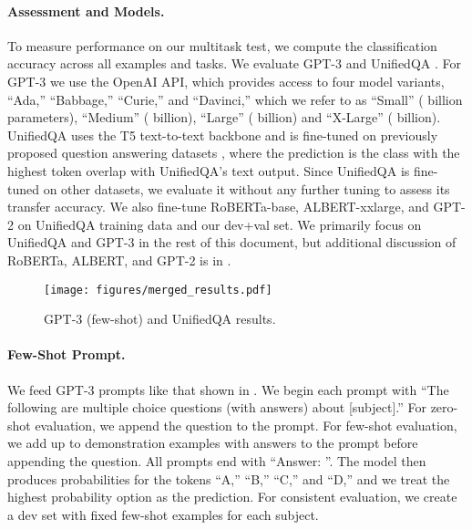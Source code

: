 \documentclass{article} \usepackage{iclr2021_conference, times}
\begin{document}
\paragraph{Assessment and Models.} To measure performance on our multitask test, we compute the classification accuracy across all examples and tasks. We evaluate GPT-3 \citep{brown2020gpt3} and UnifiedQA \citep{khashabi2020unifiedqa}.
For GPT-3 we use the OpenAI API, which provides access to four model variants,  ``Ada,'' ``Babbage,'' ``Curie,'' and ``Davinci,'' which we refer to as ``Small'' ( billion parameters), ``Medium'' ( billion), ``Large'' ( billion) and ``X-Large'' ( billion). 
UnifiedQA uses the T5 \citep{raffel2019exploringT5} text-to-text backbone and is fine-tuned on previously proposed question answering datasets \citep{lai2017race}, where the prediction is the class with the highest token overlap with UnifiedQA's text output. Since UnifiedQA is fine-tuned on other datasets, we evaluate it without any further tuning to assess its transfer accuracy. We also fine-tune RoBERTa-base, ALBERT-xxlarge, and GPT-2 on UnifiedQA training data and our dev+val set. We primarily focus on UnifiedQA and GPT-3 in the rest of this document, but additional discussion of RoBERTa, ALBERT, and GPT-2 is in .


\begin{wrapfigure}{R}{0.5\textwidth}
	\vspace{-5pt}
	\begin{center}
	\texttt{[image: figures/merged\_results.pdf]}
	\end{center}
	\vspace{-10pt}
	\caption{
	GPT-3 (few-shot) and UnifiedQA results.
}\label{fig:fullresults}
	\vspace{-50pt}
\end{wrapfigure}

\paragraph{Few-Shot Prompt.} We feed GPT-3 prompts like that shown in . We begin each prompt with ``The following are multiple choice questions (with answers) about [subject].'' For zero-shot evaluation, we append the question to the prompt. For few-shot evaluation, we add up to  demonstration examples with answers to the prompt before appending the question. All prompts end with ``Answer: ''. The model then produces probabilities for the tokens ``A,'' ``B,'' ``C,'' and ``D,'' and we treat the highest probability option as the prediction. For consistent evaluation, we create a dev set with  fixed few-shot examples for each subject.
\end{document}
